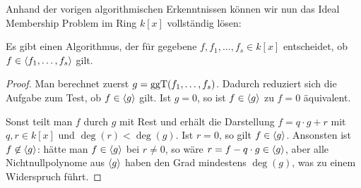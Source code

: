 \documentclass[11pt]{article}
\numberwithin{equation}{section}
\begin{document}
Anhand der vorigen algorithmischen Erkenntnissen können wir nun das Ideal Membership Problem im Ring $k[x]$ vollständig lösen: 

\begin{corollary} 
	Es gibt einen Algorithmus, der für gegebene $f, f_1,\ldots,f_s \in k[x]$ entscheidet, ob $f \in \left< f_1,\ldots,f_s \right>$ gilt. 
\end{corollary} 
\begin{proof} 
	Man berechnet zuerst $g = \operatorname{ggT}(f_1,\ldots,f_s)$. Dadurch reduziert sich die Aufgabe zum Test, ob $f \in \left< g \right>$ gilt. Ist $g=0$, so ist $f \in \left< g \right>$ zu $f=0$ äquivalent. 
	
	Sonst teilt man $f$ durch $g$ mit Rest und erhält die Darstellung $f = q \cdot g + r$ mit $q, r \in k[x]$ und $\deg(r)<\deg(g)$. Ist $r=0$, so gilt $f \in \left< g \right>$. Ansonsten ist $f \not\in \left< g \right>$: hätte man $f \in \left< g \right>$ bei $r \ne 0$, so wäre $r  = f - q \cdot g  \in \left< g \right>$, aber alle Nichtnullpolynome aus $\left< g \right>$ haben den Grad mindestens $\deg(g)$, was zu einem Widerspruch führt. 
\end{proof} 
\end{document}

